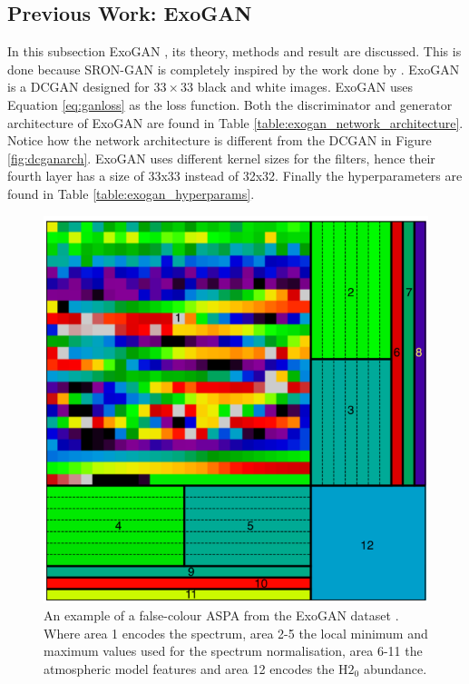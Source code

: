 \subsection{Previous Work: ExoGAN} \label{exogan}
In this subsection ExoGAN \cite{zingales2018exogan}, its theory, methods and result are discussed. This is done because SRON-GAN is completely inspired by the work done by \cite{zingales2018exogan}. ExoGAN is a DCGAN designed for $33\times33$ black and white images. ExoGAN uses Equation \ref{eq:ganloss} as the loss function. Both the discriminator and generator architecture of ExoGAN are found in Table \ref{table:exogan_network_architecture}. Notice how the network architecture is different from the DCGAN in Figure \ref{fig:dcganarch}. ExoGAN uses different kernel sizes for the filters, hence their fourth layer has a size of 33x33 instead of 32x32. Finally the hyperparameters are found in Table \ref{table:exogan_hyperparams}.

\begin{figure} [!htb]
    \centering
    \includegraphics[scale=0.35]{figuren/exogan_aspa.png}
    \caption{An example of a false-colour ASPA from the ExoGAN dataset \cite{zingales2018exogan}. Where area 1 encodes the spectrum, area 2-5 the local minimum and maximum values used for the spectrum normalisation, area 6-11 the atmospheric model features and area 12 encodes the $\mathrm{H2_0}$ abundance.}
    \label{fig:exogan_aspa}
\end{figure}


